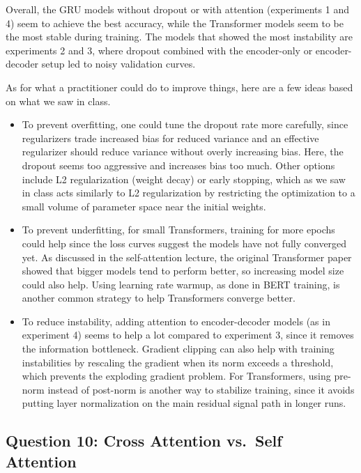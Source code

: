 \documentclass{article}
\begin{document}
Overall, the GRU models without dropout or with attention (experiments 1 and 4) seem to achieve the best accuracy, while the Transformer models seem to be the most stable during training. The models that showed the most instability are experiments 2 and 3, where dropout combined with the encoder-only or encoder-decoder setup led to noisy validation curves.

As for what a practitioner could do to improve things, here are a few ideas based on what we saw in class.
\begin{itemize}
  \item To prevent overfitting, one could tune the dropout rate more carefully, since regularizers trade increased bias for reduced variance and an effective regularizer should reduce variance without overly increasing bias. Here, the dropout seems too aggressive and increases bias too much. Other options include L2 regularization (weight decay) or early stopping, which as we saw in class acts similarly to L2 regularization by restricting the optimization to a small volume of parameter space near the initial weights.
  \item To prevent underfitting, for small Transformers, training for more epochs could help since the loss curves suggest the models have not fully converged yet. As discussed in the self-attention lecture, the original Transformer paper showed that bigger models tend to perform better, so increasing model size could also help. Using learning rate warmup, as done in BERT training, is another common strategy to help Transformers converge better.
  \item To reduce instability, adding attention to encoder-decoder models (as in experiment 4) seems to help a lot compared to experiment 3, since it removes the information bottleneck. Gradient clipping can also help with training instabilities by rescaling the gradient when its norm exceeds a threshold, which prevents the exploding gradient problem. For Transformers, using pre-norm instead of post-norm is another way to stabilize training, since it avoids putting layer normalization on the main residual signal path in longer runs.
\end{itemize}

\subsection*{Question 10: Cross Attention vs.\ Self Attention}
\end{document}
